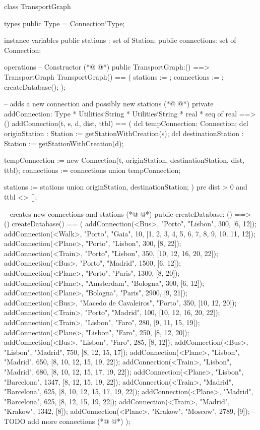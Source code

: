 \begin{vdmpp}[breaklines=true]
class TransportGraph

types
 public Type = Connection`Type;
 
instance variables
 public stations : set of Station;
 public connections: set of Connection;

operations
 -- Constructor
(*@
\label{TransportGraph:12}
@*)
 public TransportGraph:() ==> TransportGraph
 TransportGraph() ==
 (
  stations := {};
  connections := {};
  createDatabase();
 );
 
 -- adds a new connection and possibly new stations
(*@
\label{addConnection:21}
@*)
 private addConnection: Type * Utilities`String * Utilities`String * real * seq of real ==> ()
 addConnection(t, s, d, dist, ttbl) ==
 (
  dcl tempConnection: Connection;
  dcl originStation : Station := getStationWithCreation(s);
  dcl destinationStation : Station := getStationWithCreation(d);
  
  tempConnection := new Connection(t, originStation, destinationStation, dist, ttbl);
  connections := connections union {tempConnection};
  
  stations := stations union {originStation, destinationStation};
 )
 pre dist > 0 and ttbl <> [];
  
 -- creates new connections and stations
(*@
\label{createDatabase:36}
@*)
 public createDatabase: () ==> ()
  createDatabase() ==
  (
   addConnection(<Bus>,   "Porto", "Lisbon", 300, [6, 12]);
   addConnection(<Walk>,   "Porto", "Gaia", 10, [1, 2, 3, 4, 5, 6, 7, 8, 9, 10, 11, 12]);
   addConnection(<Plane>, "Porto", "Lisbon", 300, [8, 22]);
   addConnection(<Train>, "Porto", "Lisbon", 350, [10, 12, 16, 20, 22]);
   addConnection(<Bus>,   "Porto", "Madrid", 1500, [6, 12]);
   addConnection(<Plane>,   "Porto", "Paris", 1300, [8, 20]);
   addConnection(<Plane>, "Amsterdam", "Bologna", 300, [6, 12]);
   addConnection(<Plane>, "Bologna", "Paris", 2900, [9, 21]);
   addConnection(<Bus>,   "Macedo de Cavaleiros", "Porto", 350, [10, 12, 20]);
   addConnection(<Train>, "Porto", "Madrid", 100, [10, 12, 16, 20, 22]);
   addConnection(<Train>, "Lisbon", "Faro", 280, [9, 11, 15, 19]);
   addConnection(<Plane>, "Lisbon", "Faro", 250, [8, 12, 20]);
   addConnection(<Bus>,   "Lisbon", "Faro", 285, [8, 12]);
   addConnection(<Bus>, "Lisbon", "Madrid", 750, [8, 12, 15, 17]);
   addConnection(<Plane>, "Lisbon", "Madrid", 650, [8, 10, 12, 15, 19, 22]);
   addConnection(<Train>, "Lisbon", "Madrid", 680, [8, 10, 12, 15, 17, 19, 22]);
   addConnection(<Plane>, "Lisbon", "Barcelona", 1347, [8, 12, 15, 19, 22]);
   addConnection(<Train>, "Madrid", "Barcelona", 625, [8, 10, 12, 15, 17, 19, 22]);
   addConnection(<Plane>, "Madrid", "Barcelona", 625, [8, 12, 15, 19, 22]);
   addConnection(<Train>, "Madrid", "Krakow", 1342, [8]);
   addConnection(<Plane>, "Krakow", "Moscow", 2789, [9]);
   -- TODO add more connections
(*@
\label{listConnections:61}
@*)
  ); 
  

\end{vdmpp}
